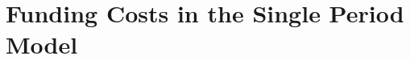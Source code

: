 \documentclass[../main.tex]{subfiles}
\begin{document}
    \section{Funding Costs in the Single Period Model}
\end{document}
